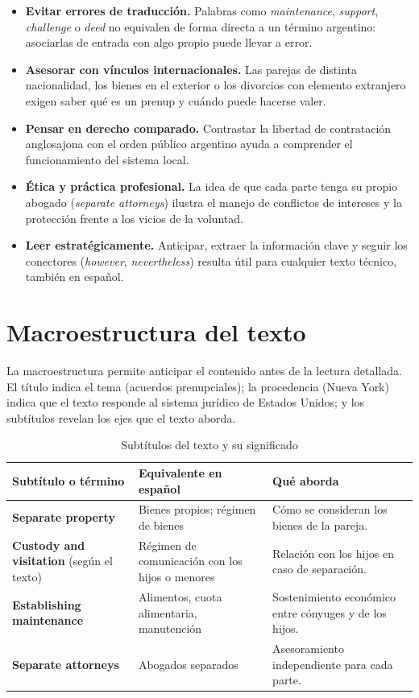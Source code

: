 \documentclass[12pt,oneside]{book}
\begin{document}
\begin{itemize}
    \item \textbf{Evitar errores de traducción.} Palabras como \textit{maintenance}, \textit{support}, \textit{challenge} o \textit{deed} no equivalen de forma directa a un término argentino: asociarlas de entrada con algo propio puede llevar a error.
    \item \textbf{Asesorar con vínculos internacionales.} Las parejas de distinta nacionalidad, los bienes en el exterior o los divorcios con elemento extranjero exigen saber qué es un prenup y cuándo puede hacerse valer.
    \item \textbf{Pensar en derecho comparado.} Contrastar la libertad de contratación anglosajona con el orden público argentino ayuda a comprender el funcionamiento del sistema local.
    \item \textbf{Ética y práctica profesional.} La idea de que cada parte tenga su propio abogado (\textit{separate attorneys}) ilustra el manejo de conflictos de intereses y la protección frente a los vicios de la voluntad.
    \item \textbf{Leer estratégicamente.} Anticipar, extraer la información clave y seguir los conectores (\textit{however}, \textit{nevertheless}) resulta útil para cualquier texto técnico, también en español.
\end{itemize}

\section{Macroestructura del texto}

La macroestructura permite anticipar el contenido antes de la lectura detallada. El título indica el tema (acuerdos prenupciales); la procedencia (Nueva York) indica que el texto responde al sistema jurídico de Estados Unidos; y los subtítulos revelan los ejes que el texto aborda.

\begin{table}[H]
\centering
\caption{Subtítulos del texto y su significado}
\begin{tabularx}{\textwidth}{@{}>{\raggedright\arraybackslash}p{}YY@{}}
\toprule
\textbf{Subtítulo o término} & \textbf{Equivalente en español} & \textbf{Qué aborda} \\
\midrule
\textbf{Separate property} & Bienes propios; régimen de bienes & Cómo se consideran los bienes de la pareja. \\
\textbf{Custody and visitation} (según el texto) & Régimen de comunicación con los hijos o menores & Relación con los hijos en caso de separación. \\
\textbf{Establishing maintenance} & Alimentos, cuota alimentaria, manutención & Sostenimiento económico entre cónyuges y de los hijos. \\
\textbf{Separate attorneys} & Abogados separados & Asesoramiento independiente para cada parte. \\
\bottomrule
\end{tabularx}
\end{table}
\end{document}

